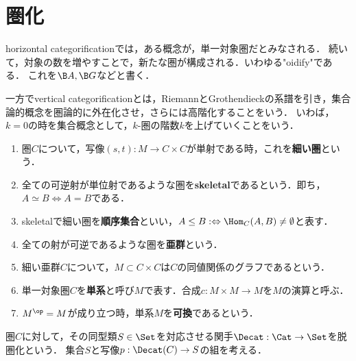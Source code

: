 \documentclass[uplatex,dvipdfmx]{jsreport}
\begin{document}
\section{圏化}

\begin{tcolorbox}[colframe=ForestGreen, colback=ForestGreen!10!white, breakable ,colbacktitle=ForestGreen!40!white, coltitle=black,fonttitle=\bfseries\sffamily,
    title=Horizontal and Vertical categorification]
    horizontal categorificationでは，ある概念が，単一対象圏だとみなされる．
    続いて，対象の数を増やすことで，新たな圏が構成される．いわゆる"oidify"である．
    これを$\B A,\B G$などと書く．
    
    一方でvertical categorificationとは，RiemannとGrothendieckの系譜を引き，集合論的概念を圏論的に外在化させ，さらには高階化することをいう．
    いわば，$k=0$の時を集合概念として，$k$-圏の階数$k$を上げていくことをいう．
\end{tcolorbox}

\begin{definition}\mbox{}
    \begin{enumerate}
        \item 圏$C$について，写像$(s,t):M\to C\times C$が単射である時，これを\textbf{細い圏}という．
        \item 全ての可逆射が単位射であるような圏を\textbf{skeletal}であるという．即ち，$A\simeq B\Leftrightarrow A=B$である．
        \item skeletalで細い圏を\textbf{順序集合}といい，$A\le B:\Leftrightarrow \Hom_C(A,B)\ne\emptyset$と表す．
        \item 全ての射が可逆であるような圏を\textbf{亜群}という．
        \item 細い亜群$C$について，$M\subset C\times C$は$C$の同値関係のグラフであるという．
        \item 単一対象圏$C$を\textbf{単系}と呼び$M$で表す．合成$c:M\times M\to M$を$M$の演算と呼ぶ．
        \item $M^\op=M$が成り立つ時，単系$M$を\textbf{可換}であるという．
    \end{enumerate}
\end{definition}

\begin{definition}[decategorification]
    圏$C$に対して，その同型類$S\in\Set$を対応させる関手$\Decat:\Cat\to\Set$を脱圏化という．
    集合$S$と写像$p:\Decat(C)\to S$の組を考える．
\end{definition}
\end{document}
